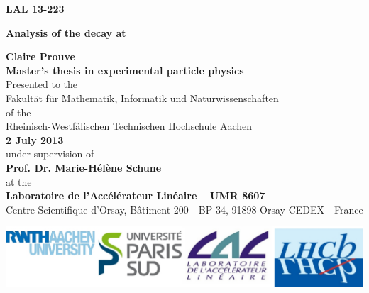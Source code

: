 \titlehead{%
} %
\titlefoot{%
}

\newsavebox{\Prof}

\begin{titlepage}
\begin{flushright}
\vspace*{-1.cm}
\textbf{LAL 13-223}
\end{flushright}
\begin{center}
\hbox{} %
\vspace*{2.5cm}
{\Huge\bfseries Analysis of the \BdKstee decay at \lhcb \par}
\vskip 1.5cm
\large{ \textbf{Claire Prouve}}\normalsize\\
\vspace{2.cm}
\large{\textbf{Master's thesis in experimental particle physics}}\normalsize\\
\vspace*{1.5cm}
Presented to the \\
Fakult\"{a}t f\"{u}r Mathematik, Informatik und Naturwissenschaften\\
of the \\
Rheinisch-Westf\"{a}lischen Technischen Hochschule Aachen\\

 \textbf{2 July 2013}\\%
  under supervision of\\
\textbf{Prof. Dr. Marie-H\'{e}l\`{e}ne Schune}\\
\vspace*{0.5cm}
at the\\
\textbf{Laboratoire de l'Acc\'{e}l\'{e}rateur Lin\'{e}aire -- UMR 8607}\\
{\small Centre Scientifique d'Orsay, B\^{a}timent 200 - BP 34, 91898 Orsay CEDEX - France}\normalsize
\end{center}
\vspace*{1.3cm}
\includegraphics[width=\textwidth]{logos.jpg}
\end{titlepage}
